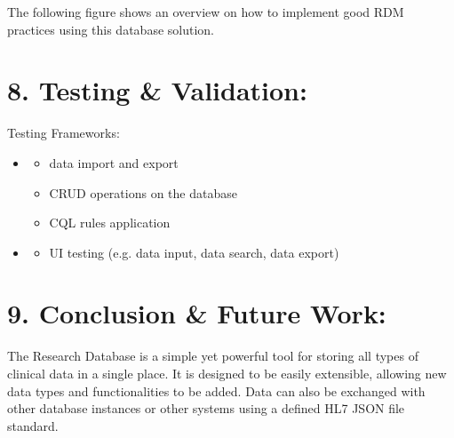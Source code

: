 \documentclass[a4paper,10pt,english]{sphinxmanual}
\begin{document}
\sphinxAtStartPar
The following figure shows an overview on how to implement good RDM practices using this database solution.

\begin{figure}[htbp]
\centering

\noindent{}
\end{figure}


\chapter{8. Testing \& Validation:}
\label{\detokenize{TechnicalDetails:testing-validation}}
\sphinxAtStartPar
Testing Frameworks:
\begin{itemize}
\item {} \begin{description}
\begin{itemize}
\item {} 
\sphinxAtStartPar
data import and export

\item {} 
\sphinxAtStartPar
CRUD operations on the database

\item {} 
\sphinxAtStartPar
CQL rules application

\end{itemize}

\end{description}

\item {} \begin{description}
\begin{itemize}
\item {} 
\sphinxAtStartPar
UI testing (e.g. data input, data search, data export)

\end{itemize}

\end{description}

\end{itemize}


\chapter{9. Conclusion \& Future Work:}
\label{\detokenize{TechnicalDetails:conclusion-future-work}}
\sphinxAtStartPar
The Research Database is a simple yet powerful tool for storing all types of clinical data in a single place. It is designed to be easily extensible, allowing new data types and functionalities to be added. Data can also be exchanged with other database instances or other systems using a defined HL7 JSON file standard.
\end{document}
